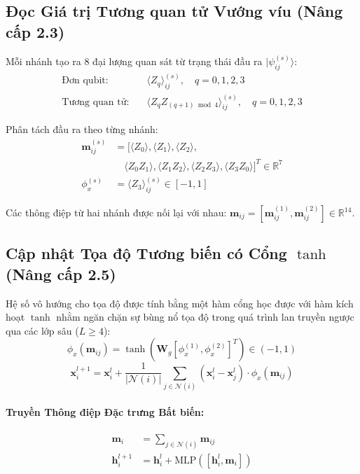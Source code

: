 \documentclass[10pt,twocolumn,letterpaper]{article}
\begin{document}
\subsection{Đọc Giá trị Tương quan tử Vướng víu (Nâng cấp 2.3)}

Mỗi nhánh tạo ra 8 đại lượng quan sát từ trạng thái đầu ra $|\psi_{ij}^{(s)}\rangle$:
\begin{align}
    \text{Đơn qubit:} \quad & \langle Z_q \rangle_{ij}^{(s)}, \quad q = 0, 1, 2, 3 \\
    \text{Tương quan tử:} \quad & \langle Z_q Z_{(q+1)\bmod 4} \rangle_{ij}^{(s)}, \quad q = 0, 1, 2, 3
\end{align}

Phân tách đầu ra theo từng nhánh:
\begin{align}
    \mathbf{m}_{ij}^{(s)} &= \big[\langle Z_0 \rangle, \langle Z_1 \rangle, \langle Z_2 \rangle, \nonumber \\
    &\quad \langle Z_0 Z_1 \rangle, \langle Z_1 Z_2 \rangle, \langle Z_2 Z_3 \rangle, \langle Z_3 Z_0 \rangle\big]^T \in \mathbb{R}^7 \\
    \phi_x^{(s)} &= \langle Z_3 \rangle_{ij}^{(s)} \in [-1, 1]
\end{align}

Các thông điệp từ hai nhánh được nối lại với nhau: $\mathbf{m}_{ij} = [\mathbf{m}_{ij}^{(1)}, \mathbf{m}_{ij}^{(2)}] \in \mathbb{R}^{14}$.

\subsection{Cập nhật Tọa độ Tương biến có Cổng $\tanh$ (Nâng cấp 2.5)}

Hệ số vô hướng cho tọa độ được tính bằng một hàm cổng học được với hàm kích hoạt $\tanh$ nhằm ngăn chặn sự bùng nổ tọa độ trong quá trình lan truyền ngược qua các lớp sâu ($L \ge 4$):
\begin{equation}
    \phi_x(\mathbf{m}_{ij}) = \tanh\!\left(\mathbf{W}_g \left[\phi_x^{(1)}, \phi_x^{(2)}\right]^T\right) \in (-1, 1)
\end{equation}
\begin{equation}
    \mathbf{x}_i^{l+1} = \mathbf{x}_i^l + \frac{1}{|\mathcal{N}(i)|} \sum_{j \in \mathcal{N}(i)} (\mathbf{x}_i^l - \mathbf{x}_j^l) \cdot \phi_x(\mathbf{m}_{ij})
    \label{eq:coord_update}
\end{equation}

\paragraph{Truyền Thông điệp Đặc trưng Bất biến:}
\begin{align}
    \mathbf{m}_i &= \sum_{j \in \mathcal{N}(i)} \mathbf{m}_{ij} \\
    \mathbf{h}_i^{l+1} &= \mathbf{h}_i^l + \mathrm{MLP}\left([\mathbf{h}_i^l, \mathbf{m}_i]\right)
    \label{eq:feat_update}
\end{align}
\end{document}
